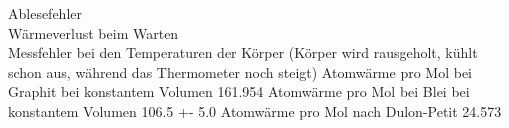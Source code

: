 Ablesefehler \\
Wärmeverlust beim Warten \\
Messfehler bei den Temperaturen der Körper (Körper wird rausgeholt, kühlt schon aus, während das Thermometer noch steigt)
Atomwärme pro Mol bei Graphit bei konstantem Volumen 161.954
Atomwärme pro Mol bei Blei bei konstantem Volumen 106.5 +-  5.0
Atomwärme pro Mol nach Dulon-Petit 24.573
